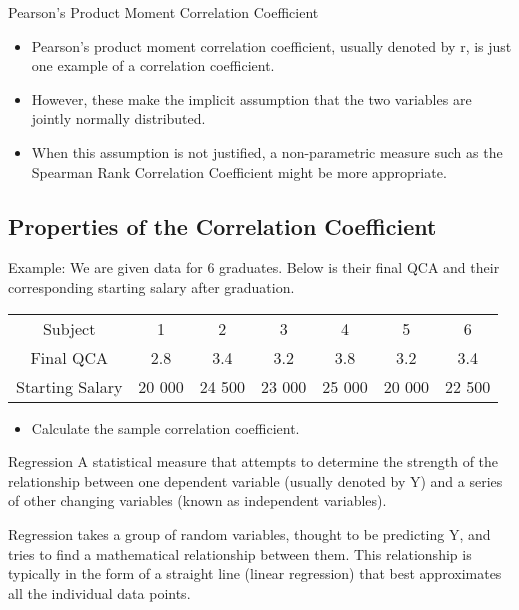 \documentclass[]{report}
\begin{document}
{Pearson's Product Moment Correlation Coefficient}
\begin{itemize}
\item Pearson's product moment correlation coefficient, usually denoted by r, is just one example of a correlation coefficient.
\smallskip
\item However, these make the implicit assumption that the two variables are jointly normally distributed. \smallskip
\item 
When this assumption is not justified, a non-parametric measure such as the Spearman Rank Correlation Coefficient might be more appropriate.
\end{itemize}





\subsection{Properties of the Correlation Coefficient}
Example: We are given data for 6 graduates. Below is their
final QCA and their corresponding starting salary after
graduation.
\begin{tabular}{|c|c|c|c|c|c|c|}
  \hline
 Subject & 1 &2 &3 &4 &5 &6\\
 Final QCA &2.8& 3.4& 3.2& 3.8& 3.2& 3.4\\
 Starting Salary &20 000 &24 500& 23 000& 25 000 &20 000 &22 500\\
  \hline
\end{tabular}


\begin{itemize}
\item Calculate the sample correlation coefficient.
\end{itemize}




{Regression}
A statistical measure that attempts to determine the strength of the relationship between one dependent variable
(usually denoted by Y) and a series of other changing variables (known as independent variables).

Regression takes a group of random variables, thought to be predicting Y, and tries to find a mathematical relationship between them. This relationship is typically in the form of a straight line (linear regression) that best approximates all the individual data points.
\end{document}
